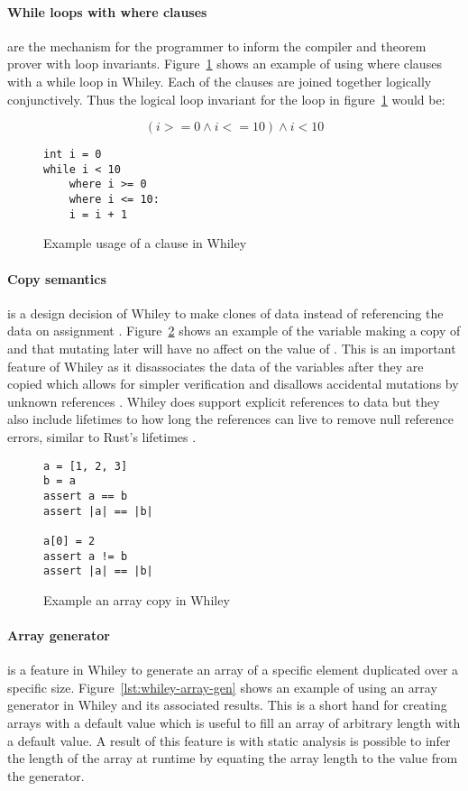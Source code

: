 \paragraph{While loops with where clauses} are the mechanism for the programmer
to inform the compiler and theorem prover with loop invariants.
Figure~\ref{lst:whiley-where} shows an example of using where clauses with a
while loop in Whiley.
Each of the  clauses are joined together logically conjunctively.
Thus the logical loop invariant for the loop in figure~\ref{lst:whiley-where} would be:

$$(i >= 0 \wedge i <= 10) \wedge i < 10$$

\begin{figure}[ht]
\begin{lstlisting}
int i = 0
while i < 10
    where i >= 0
    where i <= 10:
    i = i + 1
\end{lstlisting}
    \label{lst:whiley-where}
    \caption{Example usage of a  clause in Whiley}
\end{figure}

\paragraph{Copy semantics} is a design decision of Whiley to
make clones of data instead of referencing the data on assignment \cite{whiley-arrays}.
Figure~\ref{lst:whiley-array-copy} shows an example of the variable
 making a copy of  and that mutating  later
will have no affect on the value of .
This is an important feature of Whiley as it disassociates the data
of the variables after they are copied which allows for simpler verification
and disallows accidental mutations by unknown references \cite{whiley-array}.
Whiley does support explicit references to data but they also include
lifetimes to how long the references can live to remove null reference errors,
similar to Rust's lifetimes \cite{rust-lang}.

\begin{figure}[ht]
\begin{lstlisting}
a = [1, 2, 3]
b = a
assert a == b
assert |a| == |b|

a[0] = 2
assert a != b
assert |a| == |b|
\end{lstlisting}
    \label{lst:whiley-array-copy}
    \caption{Example an array copy in Whiley}
\end{figure}

\paragraph{Array generator} is a feature in Whiley to generate an array
of a specific element duplicated over a specific size.
Figure~\ref{lst:whiley-array-gen} shows an example of using an array generator
in Whiley and its associated results.
This is a short hand for creating arrays with a default value which is useful
to fill an array of arbitrary length with a default value.
A result of this feature is with static analysis is possible to infer the 
length of the array at runtime by equating the array length to the value
from the generator.


